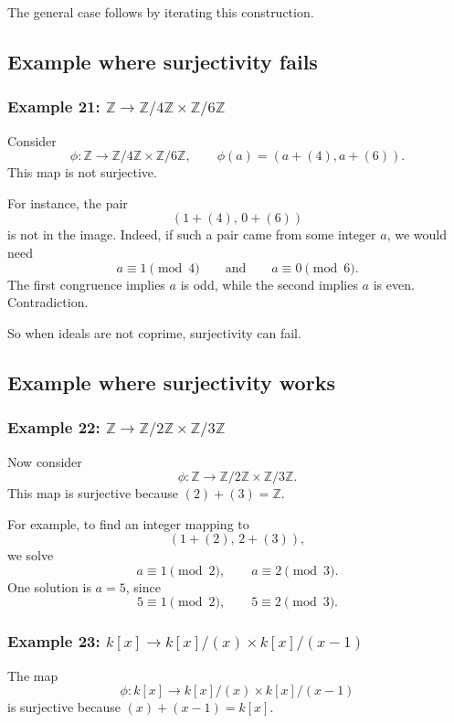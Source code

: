 \documentclass[12pt,a4paper]{article}
\theoremstyle{notespace}
\begin{document}
The general case follows by iterating this construction.

\subsection{Example where surjectivity fails}

\subsubsection*{Example 21: \(\mathbb Z\to \mathbb Z/4\mathbb Z\times \mathbb Z/6\mathbb Z\)}

Consider
\[
\phi:\mathbb Z\to \mathbb Z/4\mathbb Z\times \mathbb Z/6\mathbb Z,
\qquad
\phi(a)=(a+(4),a+(6)).
\]
This map is not surjective.

For instance, the pair
\[
(1+(4),\,0+(6))
\]
is not in the image. Indeed, if such a pair came from some integer \(a\), we would need
\[
a\equiv 1\pmod 4
\qquad\text{and}\qquad
a\equiv 0\pmod 6.
\]
The first congruence implies \(a\) is odd, while the second implies \(a\) is even. Contradiction.

So when ideals are not coprime, surjectivity can fail.

\subsection{Example where surjectivity works}

\subsubsection*{Example 22: \(\mathbb Z\to \mathbb Z/2\mathbb Z\times \mathbb Z/3\mathbb Z\)}

Now consider
\[
\phi:\mathbb Z\to \mathbb Z/2\mathbb Z\times \mathbb Z/3\mathbb Z.
\]
This map is surjective because \((2)+(3)=\mathbb Z\).

For example, to find an integer mapping to
\[
(1+(2),\,2+(3)),
\]
we solve
\[
a\equiv 1\pmod 2,
\qquad
a\equiv 2\pmod 3.
\]
One solution is \(a=5\), since
\[
5\equiv 1\pmod 2,
\qquad
5\equiv 2\pmod 3.
\]

\subsubsection*{Example 23: \(k[x]\to k[x]/(x)\times k[x]/(x-1)\)}

The map
\[
\phi:k[x]\to k[x]/(x)\times k[x]/(x-1)
\]
is surjective because \((x)+(x-1)=k[x]\).
\end{document}
